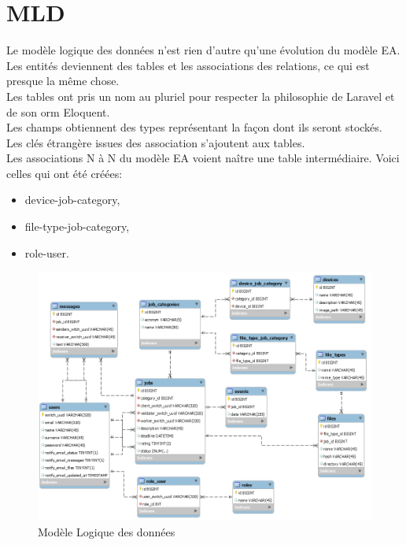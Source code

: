 \documentclass[
    iai, %
    il, %
]{heig-tb}
\begin{document}
\section{MLD}
Le modèle logique des données n'est rien d'autre qu'une évolution du modèle EA.\\
Les entités deviennent des tables et les associations des relations, ce qui est presque la même chose.\\
Les tables ont pris un nom au pluriel pour respecter la philosophie de Laravel et de son \Gls{orm} Eloquent.\\
Les champs obtiennent des types représentant la façon dont ils seront stockés.\\
Les clés étrangère issues des association s'ajoutent aux tables.\\
Les associations N à N du modèle EA voient naître une table intermédiaire. Voici celles qui ont été créées:
\begin{itemize}
    \item device-job-category,
    \item file-type-job-category,
    \item role-user.
\end{itemize}

\begin{center}
    \begin{figure}
        \includegraphics[width=\textwidth]{./assets/figures/mld.png}
        \caption{Modèle Logique des données \label{mld}}
    \end{figure}
\end{center}
\end{document}
